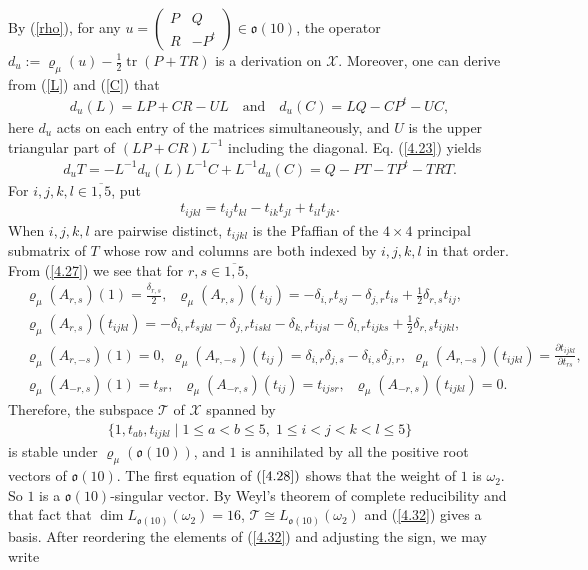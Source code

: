 \documentclass[12pt]{article}
\numberwithin{equation}{section}
\theoremstyle{definition}
\theoremstyle{remark}
\begin{document}
By (\ref{rho}), for any $u=\begin{pmatrix}
	P&Q\\R&-P^t
\end{pmatrix}\in\mathfrak{o}(10)$, the operator $d_u:=\varrho_{\mu}(u)-\frac{1}{2}\operatorname{tr}(P+TR)$ is a derivation on $\mathscr{X}$. Moreover, one can derive from (\ref{L}) and (\ref{C}) that 
\begin{eqnarray}
	d_u(L)=LP+CR-UL\quad\text{and}\quad d_u(C)=LQ-CP^t-UC, \label{4.23}
\end{eqnarray}
here $d_u$ acts on each entry of the matrices simultaneously, and $U$ is the upper triangular part of $(LP+CR)L^{-1}$ including the diagonal.
Eq. (\ref{4.23}) yields
\begin{eqnarray}
	d_uT=-L^{-1}d_u(L)L^{-1}C+L^{-1}d_u(C)=Q-PT-TP^t-TRT. \label{4.27}
\end{eqnarray}
For $i,j,k,l\in\overline{1,5}$, put
\begin{eqnarray}
	t_{ijkl}=t_{ij}t_{kl}-t_{ik}t_{jl}+t_{il}t_{jk}.
\end{eqnarray}
When $i,j,k,l$ are pairwise distinct, $t_{ijkl}$ is the Pfaffian of the $4\times 4$ principal submatrix of $T$ whose row and columns are both indexed by $i,j,k,l$ in that order.
From (\ref{4.27}) we see that for $r,s\in\overline{1,5}$,
\begin{eqnarray}
	&\varrho_{\mu}(A_{r,s})(1)=\frac{\delta_{r,s}}{2},\;\;\varrho_{\mu}(A_{r,s})(t_{ij})=-\delta_{i,r}t_{sj}-\delta_{j,r}t_{is}+\frac{1}{2}\delta_{r,s}t_{ij},\label{4.28}\\
	&\varrho_{\mu}(A_{r,s})(t_{ijkl})=-\delta_{i,r}t_{sjkl}-\delta_{j,r}t_{iskl}-\delta_{k,r}t_{ijsl}-\delta_{l,r}t_{ijks}+\frac{1}{2}\delta_{r,s}t_{ijkl}, \\
	&\varrho_{\mu}(A_{r,-s})(1)=0,\;\varrho_{\mu}(A_{r,-s})(t_{ij})=\delta_{i,r}\delta_{j,s}-\delta_{i,s}\delta_{j,r},\;\varrho_{\mu}(A_{r,-s})(t_{ijkl})=\frac{\partial t_{ijkl}}{\partial t_{rs}},\\
	&\varrho_{\mu}(A_{-r,s})(1)=t_{sr},\;\;\varrho_{\mu}(A_{-r,s})(t_{ij})=t_{ijsr},\;\;\varrho_{\mu}(A_{-r,s})(t_{ijkl})=0. \label{4.31}
\end{eqnarray}
Therefore, the subspace $\mathcal{T}$ of $\mathscr{X}$ spanned by
\begin{eqnarray}
	\{1,t_{ab},t_{ijkl}\mid 1\leqslant a<b\leqslant 5,\;1\leqslant i<j<k<l\leqslant 5 \} \label{4.32}
\end{eqnarray}is stable under $\varrho_{\mu}(\mathfrak{o}(10))$, and $1$ is annihilated by all the positive root vectors of $\mathfrak{o}(10)$. The first equation of $(\ref{4.28})$ shows that the weight of $1$ is $\omega_2$. So $1$ is a $\mathfrak{o}(10)$-singular vector. By Weyl's theorem of complete reducibility and that fact that $\dim L_{\mathfrak{o}(10)}(\omega_2)=16$, $\mathcal{T}\cong L_{\mathfrak{o}(10)}(\omega_2)$ and (\ref{4.32}) gives a basis. After reordering the elements of (\ref{4.32}) and adjusting the sign, we may write
\end{document}
